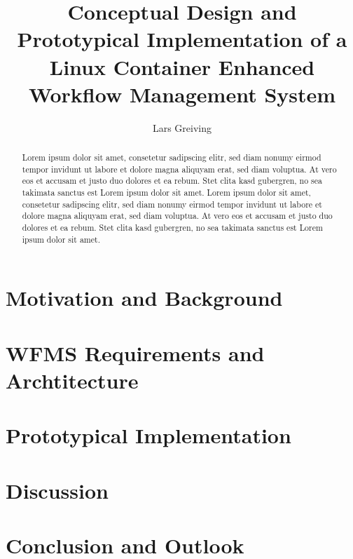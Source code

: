 \documentclass{article}
\title{Conceptual Design and Prototypical Implementation of a Linux Container Enhanced Workflow Management System}
\author{Lars Greiving}
\begin{document}
  \maketitle
  \newpage
  \begin{abstract}
    Lorem ipsum dolor sit amet, consetetur sadipscing elitr, sed diam nonumy eirmod tempor invidunt ut labore et dolore magna aliquyam erat, sed diam voluptua. At vero eos et accusam et justo duo dolores et ea rebum. Stet clita kasd gubergren, no sea takimata sanctus est Lorem ipsum dolor sit amet. Lorem ipsum dolor sit amet, consetetur sadipscing elitr, sed diam nonumy eirmod tempor invidunt ut labore et dolore magna aliquyam erat, sed diam voluptua. At vero eos et accusam et justo duo dolores et ea rebum. Stet clita kasd gubergren, no sea takimata sanctus est Lorem ipsum dolor sit amet.
  \end{abstract}
  \tableofcontents
  \newpage

  \newpage
  \section{Motivation and Background} %
  \label{sec:motivation}


  \newpage
  \section{WFMS Requirements and Archtitecture} %
  \label{sec:wfms_requirements_and_archtitecture}


  \newpage
  \section{Prototypical Implementation} %
  \label{sec:prototypical_implementation}


  \newpage
  \section{Discussion} %
  \label{sec:discussion}


  \newpage
  \section{Conclusion and Outlook} %
  \label{sec:conclusion}

\end{document}
